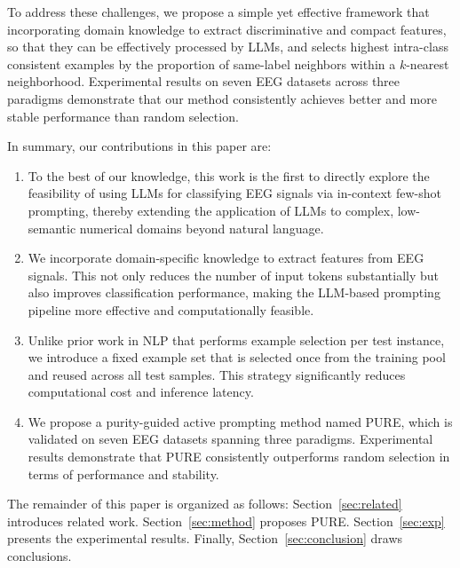 \documentclass[journal,twocolumn]{IEEEtran}
\begin{document}
To address these challenges, we propose a simple yet effective framework that incorporating domain knowledge to extract discriminative and compact features, so that they can be effectively processed by LLMs, and selects highest intra-class consistent examples by the proportion of same-label neighbors within a $k$-nearest neighborhood. Experimental results on seven EEG datasets across three paradigms demonstrate that our method consistently achieves better and more stable performance than random selection.

In summary, our contributions in this paper are:
\begin{enumerate}
\item To the best of our knowledge, this work is the first to directly explore the feasibility of using LLMs for classifying EEG signals via in-context few-shot prompting, thereby extending the application of LLMs to complex, low-semantic numerical domains beyond natural language.
\item We incorporate domain-specific knowledge to extract features from EEG signals. This not only reduces the number of input tokens substantially but also improves classification performance, making the LLM-based prompting pipeline more effective and computationally feasible.
\item Unlike prior work in NLP that performs example selection per test instance, we introduce a fixed example set that is selected once from the training pool and reused across all test samples. This strategy significantly reduces computational cost and inference latency.
\item We propose a purity-guided active prompting method named PURE, which is validated on seven EEG datasets spanning three paradigms. Experimental results demonstrate that PURE consistently outperforms random selection in terms of performance and stability.
\end{enumerate}

The remainder of this paper is organized as follows: Section~\ref{sec:related} introduces related work. Section~\ref{sec:method} proposes PURE. Section~\ref{sec:exp} presents the experimental results. Finally, Section~\ref{sec:conclusion} draws conclusions.

\end{document}

